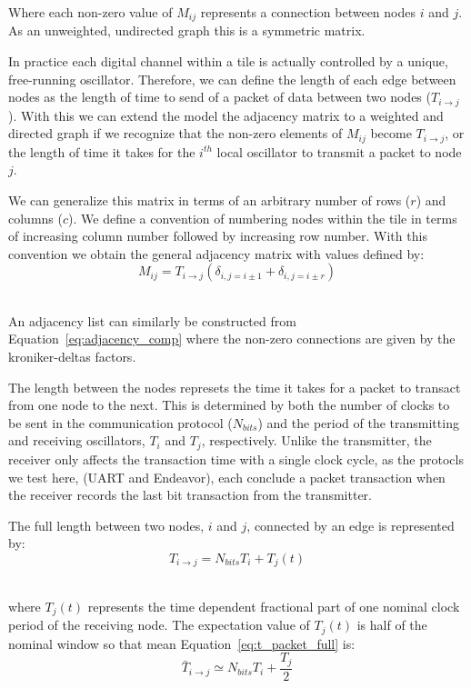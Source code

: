 Where each non-zero value of $M_{ij}$ represents a connection between nodes $i$ and $j$.
As an unweighted, undirected graph this is a symmetric matrix.

In practice each digital channel within a tile is actually controlled by a unique, free-running oscillator.
Therefore, we can define the length of each edge between nodes as the length of time to send of a packet of data between two nodes ($T_{i\rightarrow j}$).
With this we can extend the model the adjacency matrix to a weighted and directed graph if we recognize that the non-zero elements of $M_{ij}$ become $T_{i\rightarrow j}$, or the length of time it takes for the $i^{th}$ local oscillator to transmit a packet to node $j$.

We can generalize this matrix in terms of an arbitrary number of rows ($r$) and columns ($c$).
We define a convention of numbering nodes within the tile in terms of increasing column number followed by increasing row number.
With this convention we obtain the general adjacency matrix with values defined by:
\begin{equation}
  M_{ij} = T_{i\rightarrow j}(\delta_{i,j=i\pm 1} + \delta_{i,j=i\pm r})
\end{equation}~\label{eq:adjacency_comp}

An adjacency list can similarly be constructed from Equation~\ref{eq:adjacency_comp} where the non-zero connections are given by the kroniker-deltas factors.

The length between the nodes represets the time it takes for a packet to transact from one node to the next.
This is determined by both the number of clocks to be sent in the communication protocol ($N_{bits}$) and the period of the transmitting and receiving oscillators, $T_{i}$ and $T_{j}$, respectively.
Unlike the transmitter, the receiver only affects the transaction time with a single clock cycle, as the protocls we test here, (UART and Endeavor), each conclude a packet transaction when the receiver records the last bit transaction from the transmitter.

The full length between two nodes, $i$ and $j$, connected by an edge is represented by:
\begin{equation}
T_{i\rightarrow j} = N_{bits}T_{i} + T_{j}(t)
\end{equation}~\label{eq:t_packet_full}

where $T_{j}(t)$ represents the time dependent fractional part of one nominal clock period of the receiving node.
The expectation value of $T_{j}(t)$ is half of the nominal window so that mean Equation~\ref{eq:t_packet_full} is:
\begin{equation}
\bar{T}_{i\rightarrow j} \simeq N_{bits}T_{i} + \frac{T_{j}}{2}
\end{equation}~\label{eq:t_packet_avg}

